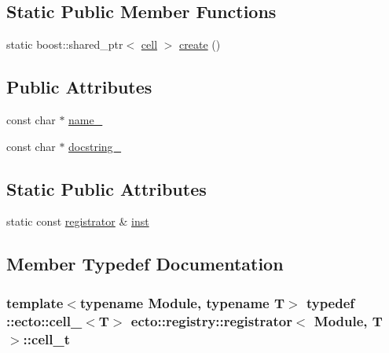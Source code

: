 \subsection*{Static Public Member Functions}
\begin{DoxyCompactItemize}
\item 
static boost\+::shared\+\_\+ptr$<$ \hyperlink{structecto_1_1cell}{cell} $>$ \hyperlink{structecto_1_1registry_1_1registrator_aa46347f24e15fcc5955523d5e2adadf7}{create} ()
\end{DoxyCompactItemize}
\subsection*{Public Attributes}
\begin{DoxyCompactItemize}
\item 
const char $\ast$ \hyperlink{structecto_1_1registry_1_1registrator_a794acc964cefc0a374129823b4ee5246}{name\+\_\+}
\item 
const char $\ast$ \hyperlink{structecto_1_1registry_1_1registrator_a6eb361c892595a3d71ab627829c07bdb}{docstring\+\_\+}
\end{DoxyCompactItemize}
\subsection*{Static Public Attributes}
\begin{DoxyCompactItemize}
\item 
static const \hyperlink{structecto_1_1registry_1_1registrator}{registrator} \& \hyperlink{structecto_1_1registry_1_1registrator_a0b0f6e3aa1718476b962a007786e7496}{inst}
\end{DoxyCompactItemize}


\subsection{Member Typedef Documentation}
\subsubsection[{\texorpdfstring{cell\+\_\+t}{cell_t}}]{\setlength{\rightskip}{0pt plus 5cm}template$<$typename Module, typename T$>$ typedef \+::{\bf ecto\+::cell\+\_\+}$<$T$>$ {\bf ecto\+::registry\+::registrator}$<$ Module, T $>$\+::{\bf cell\+\_\+t}}\hypertarget{structecto_1_1registry_1_1registrator_ae352ebfb18c87dc7fb3f649ecbe445fa}{}\label{structecto_1_1registry_1_1registrator_ae352ebfb18c87dc7fb3f649ecbe445fa}


